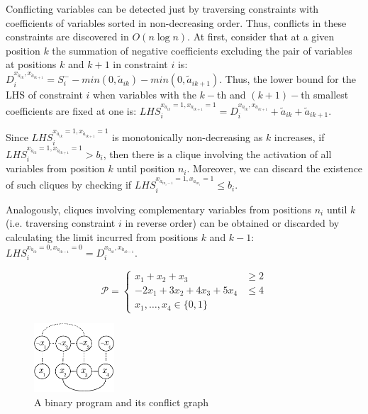 \documentclass{endm}
\begin{document}
Conflicting variables can be detected just by traversing constraints with coefficients of variables sorted in non-decreasing order. Thus, conflicts in these constraints are discovered in $O(n \log n)$. At first, consider that at a given position $k$ the summation of negative coefficients excluding the pair of variables at positions $k$ and $k+1$ in constraint $i$ is: $\displaystyle D_{i}^{x_{\acute{a}_{ik}}, x_{\acute{a}_{ik+1}}} = S_i^- - min(0, \tilde{a}_{ik}) - min(0, \tilde{a}_{ik+1})$.  Thus, the lower bound for the LHS of constraint $i$ when variables with the $k-$th and $(k+1)-$th smallest coefficients are fixed at one is: $\displaystyle LHS_{i}^{x_{\acute{a}_{ik}} = 1, x_{\acute{a}_{ik+1}} = 1} = D_{i}^{x_{\acute{a}_{ik}}, x_{\acute{a}_{ik+1}}} + \tilde{a}_{ik} + \tilde{a}_{ik+1}$.

Since $LHS_{i}^{x_{\acute{a}_{ik}} = 1, x_{\acute{a}_{ik+1}} = 1}$ is monotonically non-decreasing as $k$ increases, if $LHS_{i}^{x_{\acute{a}_{ik}} = 1, x_{\acute{a}_{ik+1}} = 1} > b_{i}$, then there is a clique involving the activation of all variables from position $k$ until position $n_i$. Moreover, we can discard the existence of such cliques by checking if $LHS_{i}^{x_{\acute{a}_{in_i-1}} = 1, x_{\acute{a}_{in_i}} = 1} \leq b_i$.

Analogously, cliques involving complementary variables from positions $n_i$ until $k$ (i.e. traversing constraint $i$ in reverse order) can be obtained or discarded by calculating the limit incurred from positions $k$ and $k-1$: $LHS_{i}^{x_{\acute{a}_{ik}} = 0, x_{\acute{a}_{ik-1}} = 0} = D_{i}^{x_{\acute{a}_{ik}}, x_{\acute{a}_{ik-1}}} $.

\begin{figure}
{\small

\begin{minipage}[b]{.5\textwidth}
 \[ \mathcal{P} = \left\{
\begin{array}{lr}
x_1+x_2+x_3 & \geq 2 \\
-2x_{1}+3x_{2}+4x_{3}+5x_{4} & \leq 4 \\
x_{1},\ldots,x_{4}\in\{0,1\}
\end{array}
\right. \]
\end{minipage}
\begin{minipage}{.5\textwidth}
	\centering
	\includegraphics[width=3.0cm]{cGraph.pdf}
\end{minipage}
}
\caption{A binary program and its conflict graph}\label{graph}
\end{figure}
\end{document}
